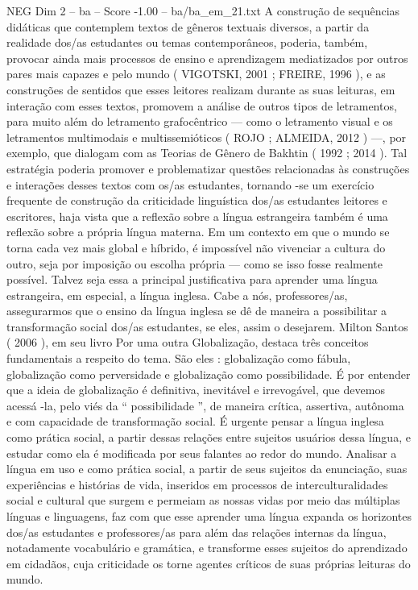 \begin{textsample}{NEG Dim 2 – ba – Score -1.00 – ba/ba\_em\_21.txt}
A construção de sequências didáticas que contemplem textos de gêneros textuais diversos, a partir da realidade dos/as estudantes ou temas contemporâneos, poderia, também, provocar ainda mais processos de ensino e aprendizagem mediatizados por outros pares mais capazes e pelo mundo ( VIGOTSKI, 2001 ; FREIRE, 1996 ), e as construções de sentidos que esses leitores realizam durante as suas leituras, em interação com esses textos, promovem a análise de outros tipos de letramentos, para muito além do letramento grafocêntrico — como o letramento visual e os letramentos multimodais e multissemióticos ( ROJO ; ALMEIDA, 2012 ) —, por exemplo, que dialogam com as Teorias de Gênero de Bakhtin ( 1992 ; 2014 ).
Tal estratégia poderia promover e problematizar questões relacionadas às construções e interações desses textos com os/as estudantes, tornando -se um exercício frequente de construção da criticidade linguística dos/as estudantes leitores e escritores, haja vista que a reflexão sobre a língua estrangeira também é uma reflexão sobre a própria língua materna.
Em um contexto em que o mundo se torna cada vez mais global e híbrido, é impossível não vivenciar a cultura do outro, seja por imposição ou escolha própria — como se isso fosse realmente possível.
Talvez seja essa a principal justificativa para aprender uma língua estrangeira, em especial, a língua inglesa.
Cabe a nós, professores/as, assegurarmos que o ensino da língua inglesa se dê de maneira a possibilitar a transformação social dos/as estudantes, se eles, assim o desejarem.
Milton Santos ( 2006 ), em seu livro Por uma outra Globalização, destaca três conceitos fundamentais a respeito do tema.
São eles : globalização como fábula, globalização como perversidade e globalização como possibilidade.
É por entender que a ideia de globalização é definitiva, inevitável e irrevogável, que devemos acessá -la, pelo viés da “ possibilidade ”, de maneira crítica, assertiva, autônoma e com capacidade de transformação social.
É urgente pensar a língua inglesa como prática social, a partir dessas relações entre sujeitos usuários dessa língua, e estudar como ela é modificada por seus falantes ao redor do mundo.
Analisar a língua em uso e como prática social, a partir de seus sujeitos da enunciação, suas experiências e histórias de vida, inseridos em processos de interculturalidades social e cultural que surgem e permeiam as nossas vidas por meio das múltiplas línguas e linguagens, faz com que esse aprender uma língua expanda os horizontes dos/as estudantes e professores/as para além das relações internas da língua, notadamente vocabulário e gramática, e transforme esses sujeitos do aprendizado em cidadãos, cuja criticidade os torne agentes críticos de suas próprias leituras do mundo.

\end{textsample}
